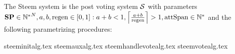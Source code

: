\begin{definition}
  The Steem system is the post voting system $\pvs$ with parameters $\stpowvec
  \in {\mathbb{N}^*}^N, a, b, \regen \in \left[0, 1\right]: a + b < 1,
  \ceil*{\frac{a + b}{\regen}} > 1, \attspan \in \mathbb{N}^*$ and the following
  parametrizing procedures:
\end{definition}
{steeminitalg.tex}
{steemauxalg.tex}
{steemhandlevotealg.tex}
{steemvotealg.tex}
